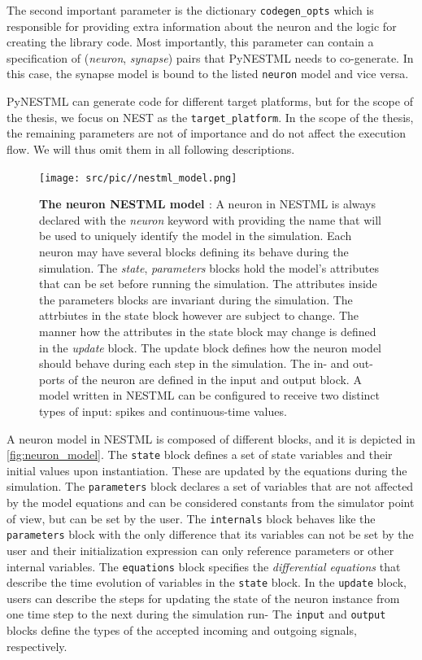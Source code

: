 The second important parameter is the dictionary \texttt{codegen\_opts} which is responsible for providing extra information about the neuron and the logic for creating the library code. Most importantly, this parameter can contain a specification of (\emph{neuron}, \emph{synapse}) pairs that PyNESTML needs to co-generate. In this case, the synapse model is bound to the listed \texttt{neuron} model and vice versa.

PyNESTML can generate code for different target platforms, but for the scope of the thesis, we focus on NEST as the \texttt{target\_platform}. In the scope of the thesis, the remaining parameters are not of importance and do not affect the execution flow. We will thus omit them in all following descriptions.

\begin{figure}[ht!]
    \centering
    \texttt{[image: src/pic//nestml\_model.png]}
    \caption{\textbf{The neuron NESTML model \cite[taken from][]{perun2018reengineering}}: A neuron in NESTML is always declared with the \emph{neuron} keyword with providing the name that will be used to uniquely identify the model in the simulation. Each neuron may have several blocks defining its behave during the simulation. The \emph{state}, \emph{parameters} blocks hold the model's attributes that can be set before running the simulation. The attributes inside the parameters blocks are invariant during the simulation. The attrbiutes in the state block however are subject to change. The manner how the attributes in the state block may change is defined in the \emph{update} block. The update block defines how the neuron model should behave during each step in the simulation. The in- and out-ports of the neuron are defined in the input and output block. A model written in NESTML can be configured to
    receive two distinct types of input: spikes and continuous-time values.} 
    \label{fig:neuron_model}
\end{figure}


A neuron model in NESTML is composed of different blocks, and it is depicted in \autoref{fig:neuron_model}. The \texttt{state} block defines a set of state variables and their initial values upon instantiation. These are updated by the equations during the simulation. The \texttt{parameters} block declares a set of variables that are not affected by the model equations and can be considered constants from the simulator point of view, but can be set by the user. The \texttt{internals} block behaves like the \texttt{parameters} block with the only difference that its variables can not be set by the user and their initialization expression can only reference parameters or other internal variables. The \texttt{equations} block specifies the \emph{differential equations} that describe the time evolution of variables in the \texttt{state} block. In the \texttt{update} block, users can describe the steps for updating the state of the neuron instance from one time step to the next during the simulation run- The \texttt{input} and \texttt{output} blocks define the types of the accepted incoming and outgoing signals, respectively. \vspace{1em}


